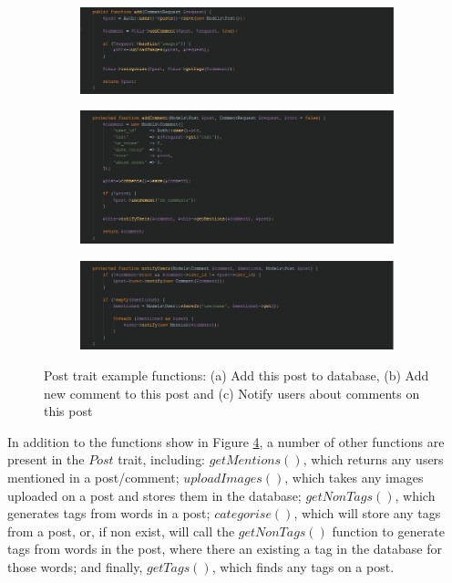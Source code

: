 \begin{figure}[H]
\centering
\begin{subfigure}[b]{1\linewidth}
    \includegraphics[width=\textwidth]{Images/Implementation/PostTraitAdd}
    \caption{}
    \label{fig:PostTraitAdd}
\end{subfigure}
\begin{subfigure}[b]{1\linewidth}
    \includegraphics[width=\textwidth]{Images/Implementation/PostTraitAddComment}
    \caption{}
    \label{fig:PostTraitAddComment}
\end{subfigure}
\begin{subfigure}[b]{1\linewidth}
    \includegraphics[width=\textwidth]{Images/Implementation/PostTraitNotifyUsers}
    \caption{}
    \label{fig:PostTraitNotifyUsers}
\end{subfigure}
\caption{Post trait example functions: (a) Add this post to database, (b) Add new comment to this post and (c) Notify users about comments on this post}
\label{fig:PostTrait}
\end{figure}

In addition to the functions show in Figure \ref{fig:PostTrait}, a number of other functions are present in the $Post$ trait, including: $getMentions()$, which returns any users mentioned in a post/comment; $uploadImages()$, which takes any images uploaded on a post and stores them in the database; $getNonTags()$, which generates tags from words in a post; $categorise()$, which will store any tags from a post, or, if non exist, will call the $getNonTags()$ function to generate tags from words in the post, where there an existing a tag in the database for those words; and finally, $getTags()$, which finds any tags on a post.

